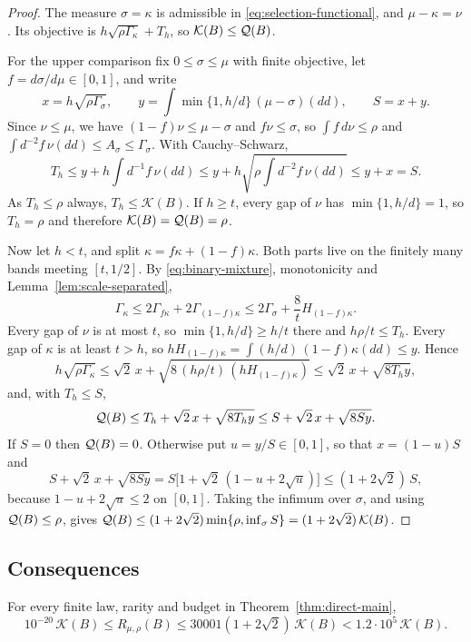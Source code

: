 \begin{proof}
The measure $\sigma=\kappa$ is admissible in
\eqref{eq:selection-functional}, and $\mu-\kappa=\nu$. Its objective is
$h\sqrt{\rho\Gamma_\kappa}+T_h$, so $\mathcal K(B)\le\mathcal Q(B)$.

For the upper comparison fix $0\le\sigma\le\mu$ with finite objective,
let $f=d\sigma/d\mu\in[0,1]$, and write
\[
 x=h\sqrt{\rho\Gamma_\sigma},\qquad
 y=\int\min\{1,h/d\}\,(\mu-\sigma)(dd),\qquad S=x+y.
\]
Since $\nu\le\mu$, we have $(1-f)\nu\le\mu-\sigma$ and $f\nu\le\sigma$,
so $\int f\,d\nu\le\rho$ and $\int d^{-2}f\,\nu(dd)\le A_\sigma\le\Gamma_\sigma$.
With Cauchy--Schwarz,
\[
 T_h\le y+h\int d^{-1}f\,\nu(dd)
 \le y+h\sqrt{\rho\int d^{-2}f\,\nu(dd)}\le y+x=S.
\]
As $T_h\le\rho$ always, $T_h\le\mathcal K(B)$. If $h\ge t$, every gap of
$\nu$ has $\min\{1,h/d\}=1$, so $T_h=\rho$ and therefore
$\mathcal K(B)=\mathcal Q(B)=\rho$.

Now let $h<t$, and split $\kappa=f\kappa+(1-f)\kappa$. Both parts live
on the finitely many bands meeting $[t,1/2]$. By \eqref{eq:binary-mixture},
monotonicity and Lemma~\ref{lem:scale-separated},
\[
 \Gamma_\kappa\le2\Gamma_{f\kappa}+2\Gamma_{(1-f)\kappa}
 \le2\Gamma_\sigma+\frac8tH_{(1-f)\kappa}.
\]
Every gap of $\nu$ is at most $t$, so $\min\{1,h/d\}\ge h/t$ there and
$h\rho/t\le T_h$. Every gap of $\kappa$ is at least $t>h$, so
$hH_{(1-f)\kappa}=\int(h/d)\,(1-f)\kappa(dd)\le y$. Hence
\[
 h\sqrt{\rho\Gamma_\kappa}\le\sqrt2\,x
 +\sqrt{8\,(h\rho/t)\,(hH_{(1-f)\kappa})}\le\sqrt2\,x+\sqrt{8T_hy},
\]
and, with $T_h\le S$,
\[
 \mathcal Q(B)\le T_h+\sqrt2\,x+\sqrt{8T_hy}\le S+\sqrt2\,x+\sqrt{8Sy}.
\]
If $S=0$ then $\mathcal Q(B)=0$. Otherwise put $u=y/S\in[0,1]$, so that
$x=(1-u)S$ and
\[
 S+\sqrt2\,x+\sqrt{8Sy}=S\bigl[1+\sqrt2\,(1-u+2\sqrt u)\bigr]
 \le(1+2\sqrt2)\,S,
\]
because $1-u+2\sqrt u\le2$ on $[0,1]$. Taking the infimum over
$\sigma$, and using $\mathcal Q(B)\le\rho$, gives
$\mathcal Q(B)\le(1+2\sqrt2)\min\{\rho,\inf_\sigma S\}=(1+2\sqrt2)\,\mathcal K(B)$.
\end{proof}

\subsection{Consequences}
\begin{corollary}\label{cor:selection-form}
For every finite law, rarity and budget in Theorem~\ref{thm:direct-main},
\[
 10^{-20}\,\mathcal K(B)\le R_{\mu,\rho}(B)
 \le30001(1+2\sqrt2)\,\mathcal K(B)<1.2\cdot10^5\,\mathcal K(B).
\]
\end{corollary}

